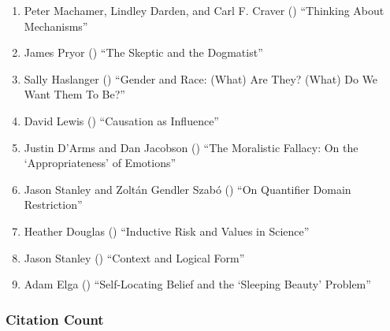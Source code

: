 \documentclass[
  10pt,
  letterpaper,
  DIV=11,
  numbers=noendperiod,
  twoside]{scrartcl}
\providecommand{\tightlist}{%
  \setlength{\itemsep}{0pt}\setlength{\parskip}{0pt}}\usepackage{longtable,booktabs,array}
\begin{document}
\begin{enumerate}
\def\labelenumi{\arabic{enumi}.}
\tightlist
\item
  Peter Machamer, Lindley Darden, and Carl F. Craver
  () ``Thinking About
  Mechanisms''
\item
  James Pryor () ``The Skeptic
  and the Dogmatist''
\item
  Sally Haslanger () ``Gender and
  Race: (What) Are They? (What) Do We Want Them To Be?''
\item
  David Lewis () ``Causation as
  Influence''
\item
  Justin D'Arms and Dan Jacobson
  () ``The Moralistic Fallacy: On
  the `Appropriateness' of Emotions''
\item
  Jason Stanley and Zoltán Gendler Szabó
  () ``On Quantifier Domain
  Restriction''
\item
  Heather Douglas () ``Inductive
  Risk and Values in Science''
\item
  Jason Stanley () ``Context and
  Logical Form''
\item
  Adam Elga () ``Self-Locating
  Belief and the `Sleeping Beauty' Problem''
\end{enumerate}

\subsubsection*{Citation Count}\label{sec-count-2000}
\end{document}
